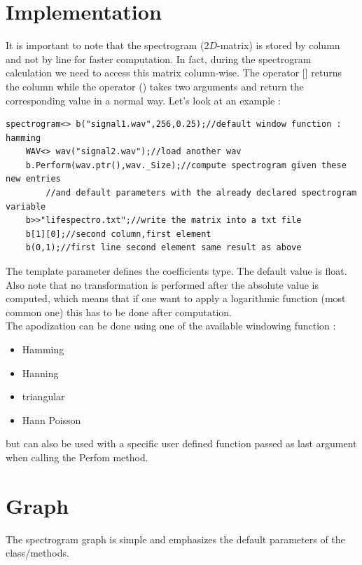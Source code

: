 \documentclass[a4paper]{report}
\begin{document}
\section{Implementation}
It is important to note that the spectrogram ($2D$-matrix) is stored by column and not by line for faster computation. In fact, during the spectrogram calculation we need to access this matrix column-wise. The operator [] returns the column while the operator () takes two arguments and return the corresponding value in a normal way. Let's look at an example :

\begin{lstlisting}[basicstyle=\tiny]
    spectrogram<> b("signal1.wav",256,0.25);//default window function : hamming
    WAV<> wav("signal2.wav");//load another wav
    b.Perform(wav.ptr(),wav._Size);//compute spectrogram given these new entries
        //and default parameters with the already declared spectrogram variable
    b>>"lifespectro.txt";//write the matrix into a txt file
    b[1][0];//second column,first element
    b(0,1);//first line second element same result as above
\end{lstlisting}

The template parameter defines the coefficients type. The default value is float. Also note that no transformation is performed after the absolute value is computed, which means that if one want to apply a logarithmic function (most common one) this has to be done after computation. 
\\
The apodization can be done using one of the available windowing function : 
\begin{itemize}
\item Hamming
\item Hanning
\item triangular
\item Hann Poisson
\end{itemize}
but can also be used with a specific user defined function passed as last argument when calling the Perfom method.
\section{Graph}
The spectrogram graph is simple and emphasizes the default parameters of the class/methods.
\end{document}
